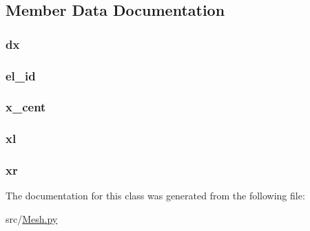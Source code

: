 \subsection{Member Data Documentation}
\hypertarget{classsrc_1_1_mesh_1_1_element_aacddc911cdfe5cd5ec97b084754542d4}{
\subsubsection[{dx}]{\setlength{\rightskip}{0pt plus 5cm}dx}}\label{classsrc_1_1_mesh_1_1_element_aacddc911cdfe5cd5ec97b084754542d4}
\hypertarget{classsrc_1_1_mesh_1_1_element_ae6d1f7a1542ce73d6d9913c97961d5ea}{
\subsubsection[{el\-\_\-id}]{\setlength{\rightskip}{0pt plus 5cm}el\-\_\-id}}\label{classsrc_1_1_mesh_1_1_element_ae6d1f7a1542ce73d6d9913c97961d5ea}
\hypertarget{classsrc_1_1_mesh_1_1_element_accf6c197a418ed2d049c5648d9c71a9e}{
\subsubsection[{x\-\_\-cent}]{\setlength{\rightskip}{0pt plus 5cm}x\-\_\-cent}}\label{classsrc_1_1_mesh_1_1_element_accf6c197a418ed2d049c5648d9c71a9e}
\hypertarget{classsrc_1_1_mesh_1_1_element_a3c53fbdcb4e4034433f7fb548430436d}{
\subsubsection[{xl}]{\setlength{\rightskip}{0pt plus 5cm}xl}}\label{classsrc_1_1_mesh_1_1_element_a3c53fbdcb4e4034433f7fb548430436d}
\hypertarget{classsrc_1_1_mesh_1_1_element_a67ac9cf4961c762581641460beb3d936}{
\subsubsection[{xr}]{\setlength{\rightskip}{0pt plus 5cm}xr}}\label{classsrc_1_1_mesh_1_1_element_a67ac9cf4961c762581641460beb3d936}


The documentation for this class was generated from the following file\-:\begin{DoxyCompactItemize}
\item 
src/\hyperlink{_mesh_8py}{Mesh.\-py}\end{DoxyCompactItemize}
